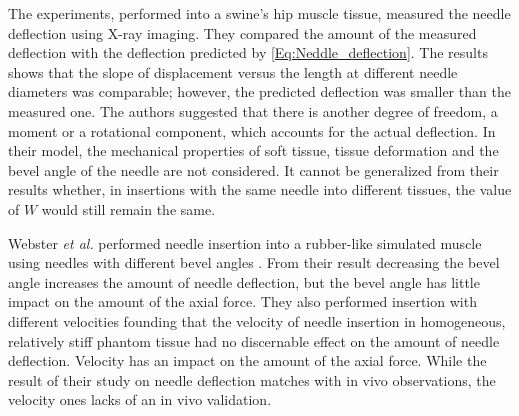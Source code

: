 The experiments, performed into a swine’s hip muscle tissue, measured the needle deflection using X-ray imaging. They compared the amount of the measured deflection with the deflection predicted by \eqref{Eq:Neddle_deflection}. The results shows that the slope of displacement versus the length at different needle diameters was comparable; however, the predicted deflection was smaller than the measured one.
The authors suggested that there is another degree of freedom, a moment or a rotational component, which accounts for the actual deflection. In their model, the mechanical properties of soft tissue, tissue deformation and the bevel angle of the needle are not considered. It cannot be generalized from their results whether, in insertions with the same needle into different tissues, the value of $W$ would still remain the same.

Webster \textit{et al.} performed needle insertion into a rubber-like simulated muscle using needles with different bevel angles \cite{WebsterIII2005}.
From their result decreasing the bevel angle increases the amount of needle deflection, but the bevel angle has little impact on the amount of the axial force.
They also performed insertion with different velocities founding that the velocity of needle insertion in homogeneous, relatively stiff phantom tissue had no discernable effect on the amount of needle deflection. Velocity has an impact on the amount of the axial force.
While the result of their study on needle deflection matches with in vivo observations, the velocity ones lacks of an in vivo validation.

